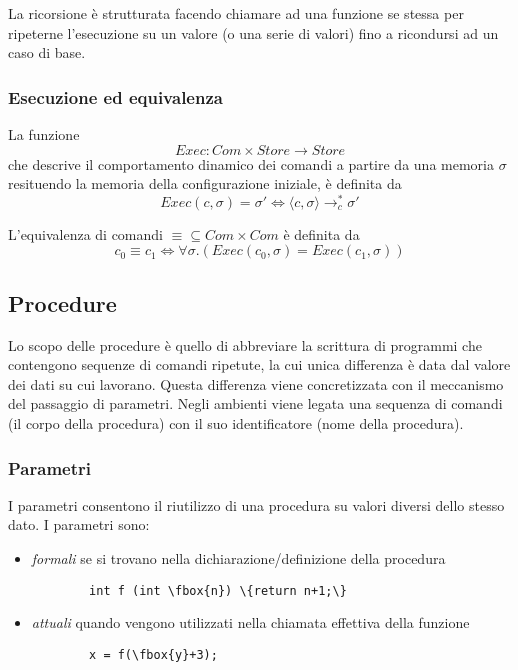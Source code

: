 \documentclass[a4paper, 10pt]{article}
\begin{document}
	La ricorsione è strutturata facendo chiamare ad una funzione se stessa per ripeterne l'esecuzione su un valore (o una serie di valori) fino a ricondursi ad un caso di base.
	
	\subsubsection{Esecuzione ed equivalenza}
	La funzione 
	\[
	Exec:Com\times Store \to Store
	\]
	che descrive il comportamento dinamico dei comandi a partire da una memoria $\sigma$ resituendo la memoria della configurazione iniziale, è definita da 
	\[
	Exec(c, \sigma)=\sigma' \iff \langle c, \sigma \rangle \to_c^* \sigma'
	\]
	
	L'equivalenza di comandi $\equiv \subseteq Com \times Com$ è definita da 
	\[
	c_0 \equiv c_1 \iff \forall \sigma.(Exec(c_0, \sigma)=Exec(c_1, \sigma))
	\]
	
	\subsection{Procedure}
	Lo scopo delle procedure è quello di abbreviare la scrittura di programmi che contengono sequenze di comandi ripetute, la cui unica differenza è data dal valore dei dati su cui lavorano. Questa differenza viene concretizzata con il meccanismo del passaggio di parametri. Negli ambienti viene legata una sequenza di comandi (il corpo della procedura) con il suo identificatore (nome della procedura).
	
	\subsubsection{Parametri}
	I parametri consentono il riutilizzo di una procedura su valori diversi dello stesso dato.
	I parametri sono:
	\begin{itemize}
		\item \textit{formali} se si trovano nella dichiarazione/definizione della procedura \\
		\begin{BVerbatim}
		int f (int \fbox{n}) \{return n+1;\}
		\end{BVerbatim}
		\item \textit{attuali} quando vengono utilizzati nella chiamata effettiva della funzione \\
		\begin{BVerbatim}
		x = f(\fbox{y}+3);
		\end{BVerbatim}
	\end{itemize}
	
\end{document}
